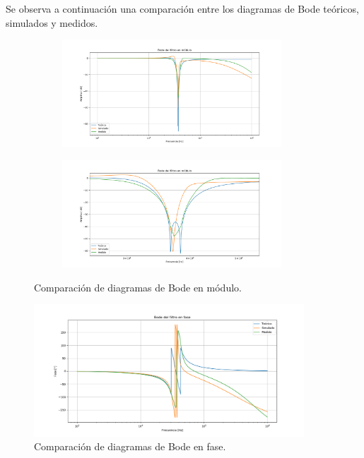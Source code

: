 Se observa a continuación una comparación entre los diagramas de Bode teóricos, simulados y medidos.
\begin{figure}[H]
\centering
\begin{subfigure}{\textwidth}
\centering
	\includegraphics[width=0.9\textwidth]{ImagenesEjercicio4/Bode-Mod-1.png}
\end{subfigure}
\begin{subfigure}{\textwidth}
\centering
	\includegraphics[width=0.9\textwidth]{ImagenesEjercicio4/Bode-Mod-3.png}
\end{subfigure}
\caption{Comparación de diagramas de Bode en módulo.}
\label{fig:bode-mod}
\end{figure}
\begin{figure}[H]
\centering
	\includegraphics[width=0.9\textwidth]{ImagenesEjercicio4/Bode-Pha-1.png}
	\caption{Comparación de diagramas de Bode en fase.}
	\label{fig:bode-pha}
\end{figure}

